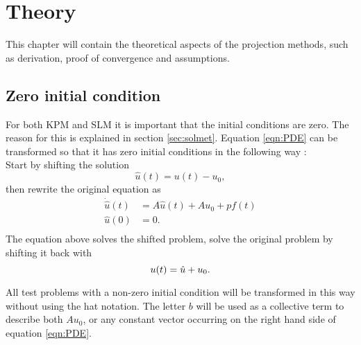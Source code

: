 \chapter{Theory}
This chapter will contain the theoretical aspects of the projection methods, such as derivation, proof of convergence and assumptions. 
 
\section{Zero initial condition}%
\label{sec:inittransf}
For both KPM and SLM it is important that the initial conditions are zero. The reason for this is explained in section \ref{sec:solmet}. Equation \eqref{eqn:PDE} can be transformed so that it has zero initial conditions in the following way \cite{zerotransf}: \\
Start by shifting the solution
\begin{equation*}
\hat{u}(t) = u(t)-u_0,
\end{equation*}
then rewrite the original equation as
\begin{equation*}
\begin{aligned}
\dot{\hat{u}}(t) &= A \hat{u}(t) +A u_0 + p f(t) \\
 \hat{u}(0)&= 0. \\
\end{aligned}
\end{equation*}
The equation above solves the shifted problem, solve the original problem by shifting it back with
\begin{equation*}
 u(t) = \hat{u} + u_0. \\
\end{equation*}


All test problems with a non-zero initial condition will be transformed in this way without using the hat notation. The letter $b$ will be used as a collective term to describe both $A u_0$, or any constant vector occurring on the right hand side of equation \eqref{eqn:PDE}.

